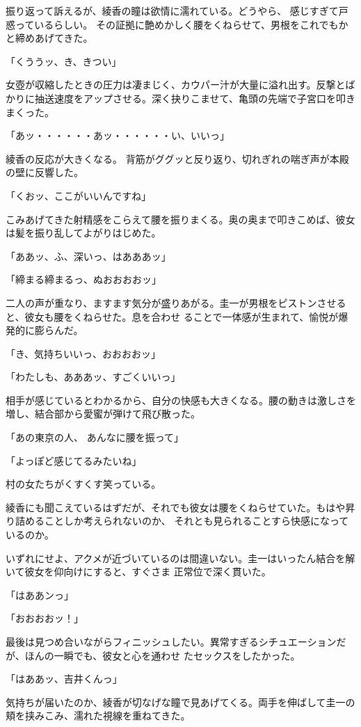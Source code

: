 ﻿\documentclass[book,tate]{jlreq}
\begin{document}
振り返って訴えるが、綾香の瞳は欲情に濡れている。どうやら、 感じすぎて戸惑っているらしい。 その証拠に艶めかしく腰をくねらせて、男根をこれでもかと締めあげてきた。

「くううッ、き、きつい」

女壺が収縮したときの圧力は凄まじく、カウパー汁が大量に溢れ出す。反撃とばかりに抽送速度をアップさせる。深く抉りこませて、亀頭の先端で子宮口を叩きまくった。

「あッ・・・・・・あッ・・・・・・い、いいっ」

綾香の反応が大きくなる。 背筋がググッと反り返り、切れぎれの喘ぎ声が本殿の壁に反響した。

「くおッ、ここがいいんですね」

こみあげてきた射精感をこらえて腰を振りまくる。奥の奥まで叩きこめば、彼女は髪を振り乱してよがりはじめた。

「ああッ、ふ、深いっ、はあああッ」

「締まる締まるっ、ぬおおおおッ」

二人の声が重なり、ますます気分が盛りあがる。圭一が男根をピストンさせると、彼女も腰をくねらせた。息を合わせ ることで一体感が生まれて、愉悦が爆発的に膨らんだ。

「き、気持ちいいっ、おおおおッ」

「わたしも、あああッ、すごくいいっ」

相手が感じているとわかるから、自分の快感も大きくなる。腰の動きは激しさを増し、結合部から愛蜜が弾けて飛び散った。

「あの東京の人、 あんなに腰を振って」

「よっぽど感じてるみたいね」

村の女たちがくすくす笑っている。

綾香にも聞こえているはずだが、それでも彼女は腰をくねらせていた。もはや昇り詰めることしか考えられないのか、 それとも見られることすら快感になっているのか。

いずれにせよ、アクメが近づいているのは間違いない。圭一はいったん結合を解いて彼女を仰向けにすると、すぐさま 正常位で深く貫いた。

「はああンっ」

「おおおおッ！」

最後は見つめ合いながらフィニッシュしたい。異常すぎるシチュエーションだが、ほんの一瞬でも、彼女と心を通わせ たセックスをしたかった。

「はああッ、吉井くんっ」

気持ちが届いたのか、綾香が切なげな瞳で見あげてくる。両手を伸ばして圭一の頬を挟みこみ、濡れた視線を重ねてきた。
\end{document}
